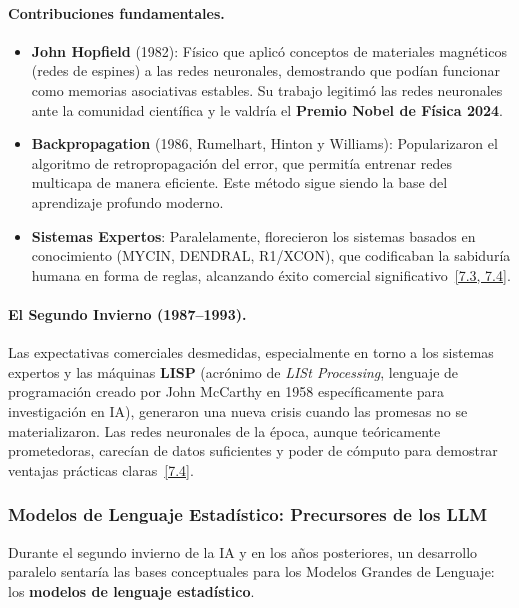 \documentclass[12pt,a4paper]{report}
\numberwithin{figure}{section}
\begin{document}
\paragraph{Contribuciones fundamentales.}
\begin{itemize}
    \item \textbf{John Hopfield} (1982): Físico que aplicó conceptos de materiales magnéticos (redes de espines) a las redes neuronales, demostrando que podían funcionar como memorias asociativas estables. Su trabajo legitimó las redes neuronales ante la comunidad científica y le valdría el \textbf{Premio Nobel de Física 2024}.
    
    \item \textbf{Backpropagation} (1986, Rumelhart, Hinton y Williams): Popularizaron el algoritmo de retropropagación del error, que permitía entrenar redes multicapa de manera eficiente. Este método sigue siendo la base del aprendizaje profundo moderno.
    
    \item \textbf{Sistemas Expertos}: Paralelamente, florecieron los sistemas basados en conocimiento (MYCIN, DENDRAL, R1/XCON), que codificaban la sabiduría humana en forma de reglas, alcanzando éxito comercial significativo~\hyperref[ref:7]{[7.3, 7.4]}.
\end{itemize}

\paragraph{El Segundo Invierno (1987--1993).}
Las expectativas comerciales desmedidas, especialmente en torno a los sistemas expertos y las máquinas \textbf{LISP} (acrónimo de \textit{LISt Processing}, lenguaje de programación creado por John McCarthy en 1958 específicamente para investigación en IA), generaron una nueva crisis cuando las promesas no se materializaron. Las redes neuronales de la época, aunque teóricamente prometedoras, carecían de datos suficientes y poder de cómputo para demostrar ventajas prácticas claras~\hyperref[ref:7]{[7.4]}.

\subsubsection[Modelos de Lenguaje Estadístico]{Modelos de Lenguaje Estadístico: Precursores de los LLM}
\label{subsubsec:modelos_estadisticos}

Durante el segundo invierno de la IA y en los años posteriores, un desarrollo paralelo sentaría las bases conceptuales para los Modelos Grandes de Lenguaje: los \textbf{modelos de lenguaje estadístico}.
\end{document}
